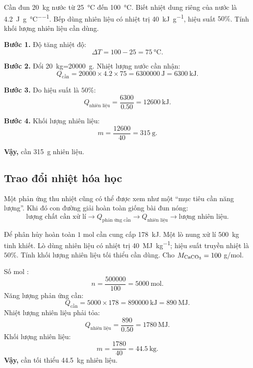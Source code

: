 \begin{vidu}
Cần đun \SI{20}{\kilo\gram} nước từ \SI{25}{\degreeCelsius} đến \SI{100}{\degreeCelsius}. Biết nhiệt dung riêng của nước là \SI{4.2}{\joule\per\gram\per\degreeCelsius}. Bếp dùng nhiên liệu có nhiệt trị \SI{40}{\kilo\joule\per\gram}, hiệu suất $50\%$. Tính khối lượng nhiên liệu cần dùng.
\end{vidu}
\begin{loigiai}
\textbf{Bước 1.} Độ tăng nhiệt độ:
\[
\Delta T=100-25=\SI{75}{\degreeCelsius}.
\]

\textbf{Bước 2.} Đổi \SI{20}{\kilo\gram}=\SI{20000}{\gram}. Nhiệt lượng nước cần nhận:
\[
Q_{\text{cần}}=20000\times4.2\times75=\SI{6300000}{\joule}=\SI{6300}{\kilo\joule}.
\]

\textbf{Bước 3.} Do hiệu suất là $50\%$:
\[
Q_{\text{nhiên liệu}}=\frac{6300}{0.50}=\SI{12600}{\kilo\joule}.
\]

\textbf{Bước 4.} Khối lượng nhiên liệu:
\[
m=\frac{12600}{40}=\SI{315}{\gram}.
\]

\textbf{Vậy,} cần \SI{315}{\gram} nhiên liệu.
\end{loigiai}

\subsection{Trao đổi nhiệt hóa học}

Một phản ứng thu nhiệt cũng có thể được xem như một ``mục tiêu cần năng lượng''. Khi đó con đường giải hoàn toàn giống bài đun nóng:
\[
\boxed{\text{lượng chất cần xử lí}}
\to
\boxed{Q_{\text{phản ứng cần}}}
\to
\boxed{Q_{\text{nhiên liệu}}}
\to
\boxed{\text{lượng nhiên liệu}}.
\]

\begin{vidu}
Để phân hủy hoàn toàn $1$ mol  cần cung cấp \SI{178}{\kilo\joule}. Một lò nung xử lí \SI{500}{\kilo\gram}  tinh khiết. Lò dùng nhiên liệu có nhiệt trị \SI{40}{\mega\joule\per\kilo\gram}; hiệu suất truyền nhiệt là $50\%$. Tính khối lượng nhiên liệu tối thiểu cần dùng. Cho $M_{\ce{CaCO3}}=100$ g/mol.
\end{vidu}
\begin{loigiai}
Số mol :
\[
n=\frac{500000}{100}=\SI{5000}{\mole}.
\]
Năng lượng phản ứng cần:
\[
Q_{\text{cần}}=5000\times178=\SI{890000}{\kilo\joule}=\SI{890}{\mega\joule}.
\]
Nhiệt lượng nhiên liệu phải tỏa:
\[
Q_{\text{nhiên liệu}}=\frac{890}{0.50}=\SI{1780}{\mega\joule}.
\]
Khối lượng nhiên liệu:
\[
m=\frac{1780}{40}=\SI{44.5}{\kilo\gram}.
\]
\textbf{Vậy,} cần tối thiểu \SI{44.5}{\kilo\gram} nhiên liệu.
\end{loigiai}
